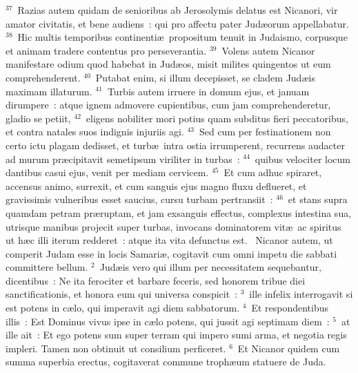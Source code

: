 ${}^{37}$~Razias autem quidam de senioribus ab Jerosolymis delatus est Nicanori, vir amator civitatis, et bene audiens~: qui pro affectu pater Jud\ae orum appellabatur.
${}^{38}$~Hic multis temporibus continenti\ae\ propositum tenuit in Judaismo, corpusque et animam tradere contentus pro perseverantia.
${}^{39}$~Volens autem Nicanor manifestare odium quod habebat in Jud\ae os, misit milites quingentos ut eum comprehenderent.
${}^{40}$~Putabat enim, si illum decepisset, se cladem Jud\ae is maximam illaturum.
${}^{41}$~Turbis autem irruere in domum ejus, et januam dirumpere~: atque ignem admovere cupientibus, cum jam comprehenderetur, gladio se petiit,
${}^{42}$~eligens nobiliter mori potius quam subditus fieri peccatoribus, et contra natales suos indignis injuriis agi.
${}^{43}$~Sed cum per festinationem non certo ictu plagam dedisset, et turb\ae\ intra ostia irrumperent, recurrens audacter ad murum pr\ae cipitavit semetipsum viriliter in turbas~:
${}^{44}$~quibus velociter locum dantibus casui ejus, venit per mediam cervicem.
${}^{45}$~Et cum adhuc spiraret, accensus animo, surrexit, et cum sanguis ejus magno fluxu deflueret, et gravissimis vulneribus esset saucius, cursu turbam pertransiit~:
${}^{46}$~et stans supra quamdam petram pr\ae ruptam, et jam exsanguis effectus, complexus intestina sua, utrisque manibus projecit super turbas, invocans dominatorem vit\ae\ ac spiritus ut h\ae c illi iterum redderet~: atque ita vita defunctus est.
~\lettrine[lines=10,image=true,loversize=0.05,lraise=-0.03]{N}{}icanor autem, ut comperit Judam esse in locis Samari\ae , cogitavit cum omni impetu die sabbati committere bellum.
${}^{2}$~Jud\ae is vero qui illum per necessitatem sequebantur, dicentibus~: Ne ita ferociter et barbare feceris, sed honorem tribue diei sanctificationis, et honora eum qui universa conspicit~:
${}^{3}$~ille infelix interrogavit si est potens in c\ae lo, qui imperavit agi diem sabbatorum.
${}^{4}$~Et respondentibus illis~: Est Dominus vivus ipse in c\ae lo potens, qui jussit agi septimam diem~:
${}^{5}$~at ille ait~: Et ego potens sum super terram qui impero sumi arma, et negotia regis impleri. Tamen non obtinuit ut consilium perficeret.
${}^{6}$~Et Nicanor quidem cum summa superbia erectus, cogitaverat commune troph\ae um statuere de Juda.


